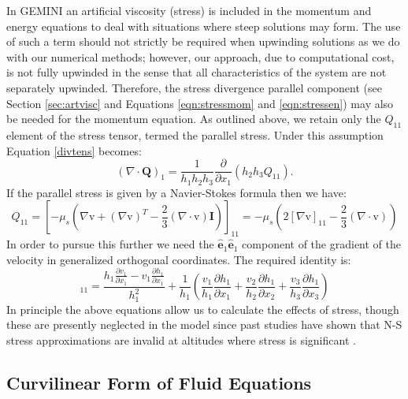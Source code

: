 \documentclass[11pt,letterpaper]{article}
\begin{document}
In GEMINI an artificial viscosity (stress) is included in the momentum and energy equations to deal with situations where steep solutions may form.  The use of such a term should not strictly be required when upwinding solutions as we do with our numerical methods; however, our approach, due to computational cost, is not fully upwinded in the sense that all characteristics of the system are not separately upwinded.  Therefore, the stress divergence parallel component (see Section \ref{sec:artvisc} and Equations \ref{eqn:stressmom} and \ref{eqn:stressen}) may also be needed for the momentum equation.  As outlined above, we retain only the $Q_{11}$ element of the stress tensor, termed the parallel stress.  Under this assumption Equation \ref{divtens} becomes:
\begin{equation}
(\nabla \cdot \mathbf{Q})_1 = \frac{1}{h_1 h_2 h_3} \frac{\partial}{\partial x_1}(h_2 h_3 Q_{11}).
\end{equation}
If the parallel stress is given by a Navier-Stokes formula then we have:
\begin{equation}
Q_{11} = \left[-\mu_s \left( \nabla \boldsymbol{\mathrm{v}} + (\nabla \boldsymbol{\mathrm{v}})^T - \frac{2}{3} (\nabla \cdot \boldsymbol{\mathrm{v}}) \mathbf{I} \right) \right]_{11} = -\mu_s \left( 2 [\nabla \boldsymbol{\mathrm{v}}]_{11} - \frac{2}{3} (\nabla \cdot \boldsymbol{\mathrm{v}}) \right)
\end{equation}
In order to pursue this further we need the $\hat{\mathbf{e}}_1 \hat{\mathbf{e}}_1$ component of the gradient of the velocity in generalized orthogonal coordinates.  The required identity is:
\begin{equation}
[\nabla \boldsymbol{\mathrm{v}}]_{11} = \frac{h_1 \frac{\partial v_1}{\partial x_1} - v_1 \frac{\partial h_1}{\partial x_1}}{h_1^2} + \frac{1}{h_1} \left( \frac{v_1}{h_1} \frac{\partial h_1}{\partial x_1} + \frac{v_2}{h_2} \frac{\partial h_1}{\partial x_2} + \frac{v_3}{h_3} \frac{\partial h_1}{\partial x_3} \right)
\end{equation}
In principle the above equations allow us to calculate the effects of stress, though these are presently neglected in the model since past studies have shown that N-S stress approximations are invalid at altitudes where stress is significant \citep{Schunk:1975}.

\subsection{Curvilinear Form of Fluid Equations}
\end{document}

